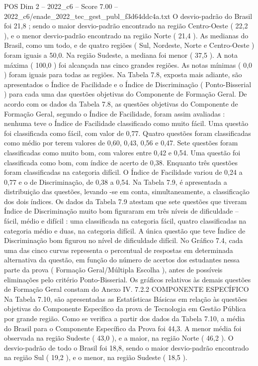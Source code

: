 \begin{textsample}{POS Dim 2 – 2022\_c6 – Score 7.00 – 2022\_c6/enade\_2022\_tec\_gest\_publ\_f3d64ddc4a.txt}
O desvio-padrão do Brasil foi 21,8 ; sendo o maior desvio-padrão encontrado na região Centro-Oeste ( 22,2 ), e o menor desvio-padrão encontrado na região Norte ( 21,4 ).
As medianas do Brasil, como um todo, e de quatro regiões ( Sul, Nordeste, Norte e Centro-Oeste ) foram iguais a 50,0.
Na região Sudeste, a mediana foi menor ( 37,5 ).
A nota máxima ( 100,0 ) foi alcançada nas cinco grandes regiões.
As notas mínimas ( 0,0 ) foram iguais para todas as regiões.
Na Tabela 7.8, exposta mais adiante, são apresentados o Índice de Facilidade e o Índice de Discriminação ( Ponto-Bisserial ) para cada uma das questões objetivas do Componente de Formação Geral.
De acordo com os dados da Tabela 7.8, as questões objetivas do Componente de Formação Geral, segundo o Índice de Facilidade, foram assim avaliadas : nenhuma teve o Índice de Facilidade classificado como muito fácil.
Uma questão foi classificada como fácil, com valor de 0,77.
Quatro questões foram classificadas como médio por terem valores de 0,60, 0,43, 0,56 e 0,47.
Sete questões foram classificadas como muito bom, com valores entre 0,42 e 0,54.
Uma questão foi classificada como bom, com índice de acerto de 0,38.
Enquanto três questões foram classificadas na categoria difícil.
O Índice de Facilidade variou de 0,24 a 0,77 e o de Discriminação, de 0,38 a 0,54.
Na Tabela 7.9, é apresentada a distribuição das questões, levando -se em conta, simultaneamente, a classificação dos dois índices.
Os dados da Tabela 7.9 atestam que sete questões que tiveram Índice de Discriminação muito bom figuraram em três níveis de dificuldade – fácil, médio e difícil : uma classificada na categoria fácil, quatro classificadas na categoria médio e duas, na categoria difícil.
A única questão que teve Índice de Discriminação bom figurou no nível de dificuldade difícil.
No Gráfico 7.4, cada uma das cinco curvas representa o percentual de respostas em determinada alternativa da questão, em função do número de acertos dos estudantes nessa parte da prova ( Formação Geral/Múltipla Escolha ), antes de possíveis eliminações pelo critério Ponto-Bisserial.
Os gráficos relativos às demais questões de Formação Geral constam do Anexo IV. 7.2.2 COMPONENTE ESPECÍFICO Na Tabela 7.10, são apresentadas as Estatísticas Básicas em relação às questões objetivas do Componente Específico da prova de Tecnologia em Gestão Pública por grande região.
Como se verifica a partir dos dados da Tabela 7.10, a média do Brasil para o Componente Específico da Prova foi 44,3.
A menor média foi observada na região Sudeste ( 43,0 ), e a maior, na região Norte ( 46,2 ).
O desvio-padrão de todo o Brasil foi 18,8, sendo o maior desvio-padrão encontrado na região Sul ( 19,2 ), e o menor, na região Sudeste ( 18,5 ).

\end{textsample}
